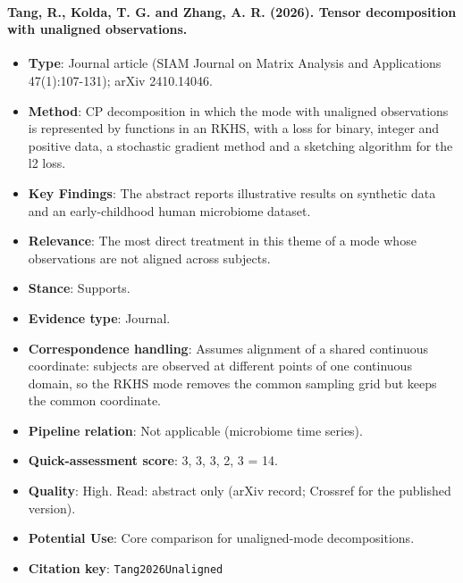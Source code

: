 \documentclass[journal,onecolumn]{IEEEtran}
\begin{document}
\paragraph{Tang, R., Kolda, T. G. and Zhang, A. R. (2026). Tensor decomposition with unaligned observations.~\cite{Tang2026Unaligned}}\mbox{}

\begin{itemize}

\item{} \textbf{Type}: Journal article (SIAM Journal on Matrix Analysis and Applications 47(1):107-131); arXiv 2410.14046.

\item{} \textbf{Method}: CP decomposition in which the mode with unaligned observations is represented by functions in an RKHS, with a loss for binary, integer and positive data, a stochastic gradient method and a sketching algorithm for the l2 loss.

\item{} \textbf{Key Findings}: The abstract reports illustrative results on synthetic data and an early-childhood human microbiome dataset.

\item{} \textbf{Relevance}: The most direct treatment in this theme of a mode whose observations are not aligned across subjects.

\item{} \textbf{Stance}: Supports.

\item{} \textbf{Evidence type}: Journal.

\item{} \textbf{Correspondence handling}: Assumes alignment of a shared continuous coordinate: subjects are observed at different points of one continuous domain, so the RKHS mode removes the common sampling grid but keeps the common coordinate.

\item{} \textbf{Pipeline relation}: Not applicable (microbiome time series).

\item{} \textbf{Quick-assessment score}: 3, 3, 3, 2, 3 = 14.

\item{} \textbf{Quality}: High. Read: abstract only (arXiv record; Crossref for the published version).

\item{} \textbf{Potential Use}: Core comparison for unaligned-mode decompositions.

\item{} \textbf{Citation key}: \texttt{Tang2026Unaligned}

\end{itemize}
\end{document}
